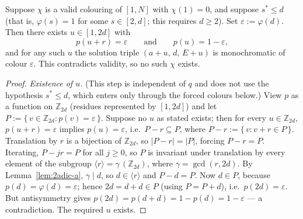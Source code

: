 \begin{lemma}\label{lem:ub1-caseA}
Suppose $\chi$ is a valid colouring of $[1,N]$ with $\chi(1) = 0$, and
suppose $s^{*} \le d$ (that is, $\varphi(s) = 1$ for some $s \in [2,d]$;
this requires $d \ge 2$). Set $\varepsilon := \varphi(d)$. Then there
exists $u \in [1, 2d]$ with
\[
p(u + r) = \varepsilon \qquad\text{and}\qquad p(u) = 1 - \varepsilon ,
\]
and for any such $u$ the solution triple $(a + u,\, d,\, E + u)$ is
monochromatic of colour $\varepsilon$. This contradicts validity, so no
such $\chi$ exists.
\end{lemma}

\begin{proof}
\emph{Existence of $u$.} (This step is independent of $q$ and does not use
the hypothesis $s^{*} \le d$, which enters only through the forced colours
below.) View $p$ as a function on $\mathbb{Z}_{2d}$
(residues represented by $[1, 2d]$) and let
$P := \{\, v \in \mathbb{Z}_{2d} : p(v) = \varepsilon \,\}$. Suppose no $u$
as stated exists; then for every $u \in \mathbb{Z}_{2d}$,
$p(u + r) = \varepsilon$ implies $p(u) = \varepsilon$, i.e.\
$P - r \subseteq P$, where $P - r := \{\, v : v + r \in P \,\}$.
Translation by $r$ is a bijection of $\mathbb{Z}_{2d}$, so $|P - r| = |P|$,
forcing $P - r = P$. Iterating, $P - jr = P$ for all $j \ge 0$, so $P$ is
invariant under translation by every element of the subgroup
$\langle r \rangle = \gamma\,(\mathbb{Z}_{2d})$, where $\gamma = \gcd(r, 2d)$.
By Lemma~\ref{lem:2adic-a}, $\gamma \mid d$, so $d \in \langle r \rangle$
and $P - d = P$. Now $d \in P$, because
$p(d) = \varphi(d) = \varepsilon$; hence $2d = d + d \in P$ (using
$P = P + d$), i.e.\ $p(2d) = \varepsilon$. But antisymmetry gives
$p(2d) = p(d + d) = 1 - p(d) = 1 - \varepsilon$ --- a contradiction. The
required $u$ exists.


\end{proof}
